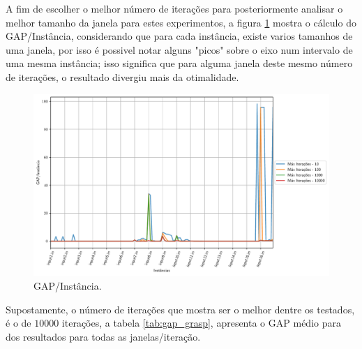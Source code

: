 \documentclass[a4paper, 12pt]{article}
\begin{document}
A fim de escolher o melhor número de iterações para posteriormente analisar o melhor tamanho da janela
para estes experimentos, a figura \ref{gap_all_grasp} mostra o cálculo do GAP/Instância, considerando que para cada instância, existe varios 
tamanhos de uma janela, por isso é possivel notar alguns "picos" sobre o eixo num intervalo de uma mesma instância;
isso significa que para alguma janela deste mesmo número de iterações, o resultado divergiu mais da otimalidade.

\begin{figure}[h]
    \centering
    \includegraphics[width=1\linewidth]{../imgs/gap_all_grasp.pdf}
    \caption{GAP/Instância.}
    \label{gap_all_grasp}
\end{figure}

Supostamente, o número de iterações que mostra ser o melhor dentre os testados, é o de $10000$ iterações, a
tabela \ref{tab:gap_grasp}, apresenta o GAP médio para dos resultados para todas as janelas/iteração.

\begin{table}[htbp]
    \centering
\end{table}
\end{document}
